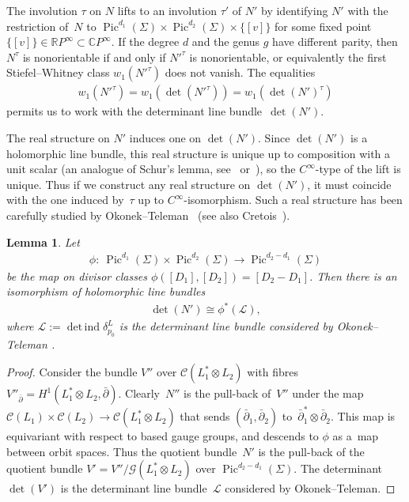 \documentclass[pdftex]{sigma}
\numberwithin{equation}{section}
\newtheorem{Lemma}[Theorem]{Lemma}
\begin{document}
The involution $\tau$ on $N$ lifts to an involution $\tau'$ of $N'$ by identifying $N'$ with the restriction of~$N$ to $\operatorname{Pic}^{d_1}(\Sigma) \times \operatorname{Pic}^{d_2}(\Sigma) \times \{[v]\}$ for some f\/ixed point $\{[v]\} \in {\mathbb R} P^{\infty} \subset {\mathbb C} P^{\infty}$. If the degree $d$ and the genus $g$ have dif\/ferent parity, then $N^{\tau}$ is nonorientable if and only if $N'^{\tau}$ is nonorientable, or equivalently the f\/irst Stiefel--Whitney class $w_1(N'^{\tau})$ does not vanish. The equalities{\samepage \begin{gather*}w_1(N'^{\tau}) = w_1(\det(N'^{\tau})) = w_1(\det(N')^{\tau})\end{gather*} permits us to work with the determinant line bundle~$\det(N')$.}

The real structure on $N'$ induces one on $\det(N')$. Since $\det(N')$ is a holomorphic line bundle, this real structure is unique up to composition with a unit scalar (an analogue of Schur's lemma, see~\cite{BHH} or~\cite{OT}), so the $C^{\infty}$-type of the lift is unique. Thus if we construct any real structure on $\det(N')$, it must coincide with the one induced by~$\tau$ up to $C^{\infty}$-isomorphism. Such a real structure has been carefully studied by Okonek--Teleman~\cite{OT} (see also Cretois~\cite{C}).

\begin{Lemma}\label{themapphi}
Let
\begin{gather*}\phi\colon \ \operatorname{Pic}^{d_1}(\Sigma) \times \operatorname{Pic}^{d_2}(\Sigma) \rightarrow \operatorname{Pic}^{d_2-d_1}(\Sigma)\end{gather*}
be the map on divisor classes $ \phi([D_1], [D_2]) = [D_2-D_1]$. Then there is an isomorphism of holomorphic line bundles \begin{gather*} \det(N') \cong \phi^*( {\mathcal L}), \end{gather*}
where ${\mathcal L} := \operatorname{det \, ind} \delta_{p_0}^L$ is the determinant line bundle considered by Okonek--Teleman {\rm \cite[Section~1]{OT}}.
\end{Lemma}


\begin{proof}
Consider the bundle $V''$ over ${\mathcal C}(L_1^*\otimes L_2)$ with f\/ibres $V''_{\bar{\partial}} = H^1(L_1^* \otimes L_2, \bar{\partial})$. Clearly~$N''$ is the pull-back of~$V''$ under the map ${\mathcal C}(L_1) \times {\mathcal C}(L_2) \rightarrow {\mathcal C}(L_1^* \otimes L_2)$ that sends $(\bar{\partial}_1, \bar{\partial}_2)$ to~$\bar{\partial}_1^*\otimes \bar{\partial}_2$. This map is equivariant with respect to based gauge groups, and descends to $\phi$ as a~map between orbit spaces. Thus the quotient bundle~$N'$ is the pull-back of the quotient bundle $V' = V''/ {\mathcal G}(L_1^* \otimes L_2)$ over $\operatorname{Pic}^{d_2-d_1}(\Sigma)$. The determinant~$\det(V')$ is the determinant line bundle~${\mathcal L}$ considered by Okonek--Teleman.
\end{proof}
\end{document}
